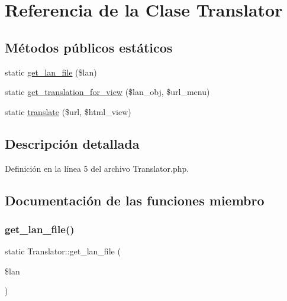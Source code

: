 \hypertarget{class_translator}{}\section{Referencia de la Clase Translator}
\label{class_translator}
\subsection*{Métodos públicos estáticos}
\begin{DoxyCompactItemize}
\item 
static \mbox{\hyperlink{class_translator_a359e93b0f7c7037893c54e5c1df94a79}{get\+\_\+lan\+\_\+file}} (\$lan)
\item 
static \mbox{\hyperlink{class_translator_a58b9a1f4ddada4fcd2a0a302f902f791}{get\+\_\+translation\+\_\+for\+\_\+view}} (\$lan\+\_\+obj, \$url\+\_\+menu)
\item 
static \mbox{\hyperlink{class_translator_a9304be95639cc658a31a56dbfdd5ac7b}{translate}} (\$url, \$html\+\_\+view)
\end{DoxyCompactItemize}


\subsection{Descripción detallada}


Definición en la línea 5 del archivo Translator.\+php.



\subsection{Documentación de las funciones miembro}
\mbox{\label{class_translator_a359e93b0f7c7037893c54e5c1df94a79}} 
\subsubsection{\texorpdfstring{get\_lan\_file()}{get\_lan\_file()}}
{\footnotesize\ttfamily static Translator\+::get\+\_\+lan\+\_\+file (\begin{DoxyParamCaption}\item[{}]{\$lan }\end{DoxyParamCaption})\hspace{0.3cm}{\ttfamily [static]}}

